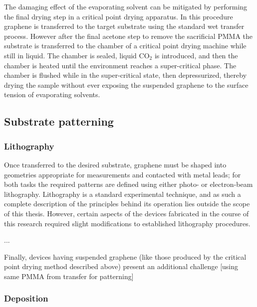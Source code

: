 \documentclass[edeposit,fullpage,draftthesis]{uiucthesis2009}
\begin{document}
        The damaging effect of the evaporating solvent can be mitigated by performing the final
        drying step in a critical point drying apparatus. In this procedure graphene
        is transferred to the target substrate using the standard wet transfer process. 
        However after the 
        final acetone step to remove the sacrificial PMMA the substrate is transferred
        to the chamber of a critical point drying machine while still in liquid.
        The chamber is sealed, liquid CO$_2$ is introduced, and then the chamber is heated until the environment 
        reaches a super-critical phase. The chamber is flushed while in the super-critical state,
        then depressurized, thereby drying the sample without ever exposing the suspended graphene 
        to the surface tension of evaporating solvents.
            
            
        \subsection{Substrate patterning}
        
            \subsubsection{Lithography}
            
            Once transferred to the desired substrate, graphene must be shaped into geometries
            appropriate for measurements and contacted with metal leads; for both tasks the 
            required patterns are defined using either photo- or electron-beam lithography.
            Lithography is a standard experimental technique, and as such a complete description
            of the principles behind its operation lies outside the scope of this thesis. However,
            certain aspects of the devices fabricated in the course of this research required
            slight modifications to established lithography procedures.
            
            ...
            
            Finally, devices having suspended graphene (like those produced by the critical point
            drying method described above) present an additional challenge
            [using same PMMA from transfer for patterning]
            
            \subsubsection{Deposition}
\end{document}
